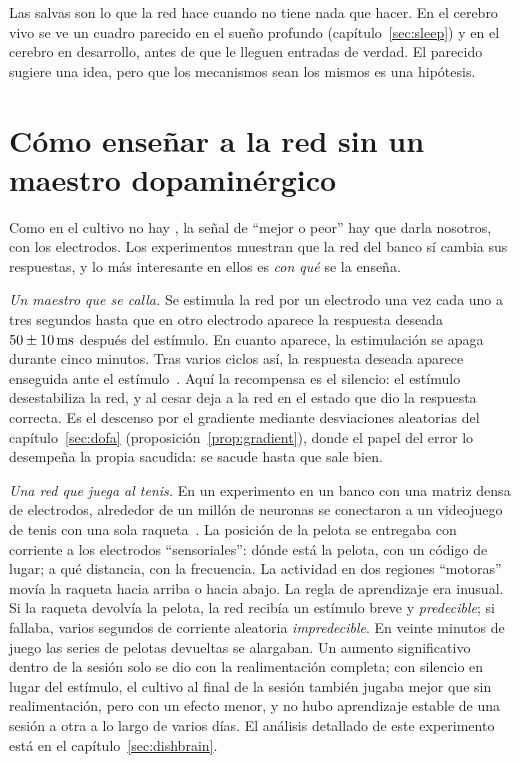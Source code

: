 Las salvas son lo que la red hace cuando no tiene nada que hacer. En el cerebro vivo se ve un cuadro parecido en el sueño profundo (capítulo~\ref{sec:sleep}) y en el cerebro en desarrollo, antes de que le lleguen entradas de verdad. El parecido sugiere una idea, pero que los mecanismos sean los mismos es una hipótesis.

\section{Cómo enseñar a la red sin un maestro dopaminérgico}

Como en el cultivo no hay , la señal de “mejor o peor” hay que darla nosotros, con los electrodos. Los experimentos muestran que la red del banco sí cambia sus respuestas, y lo más interesante en ellos es \emph{con qué} se la enseña.

\emph{Un maestro que se calla.} Se estimula la red por un electrodo una vez cada uno a tres segundos hasta que en otro electrodo aparece la respuesta deseada $50\pm10\,\text{ms}$ después del estímulo. En cuanto aparece, la estimulación se apaga durante cinco minutos. Tras varios ciclos así, la respuesta deseada aparece enseguida ante el estímulo~\cite{Shahaf2001}. Aquí la recompensa es el silencio: el estímulo desestabiliza la red, y al cesar deja a la red en el estado que dio la respuesta correcta. Es el descenso por el gradiente mediante desviaciones aleatorias del capítulo~\ref{sec:dofa} (proposición~\ref{prop:gradient}), donde el papel del error lo desempeña la propia sacudida: se sacude hasta que sale bien.

\emph{Una red que juega al tenis.} En un experimento en un banco con una matriz densa de electrodos, alrededor de un millón de neuronas se conectaron a un videojuego de tenis con una sola raqueta~\cite{Kagan2022}. La posición de la pelota se entregaba con corriente a los electrodos “sensoriales”: dónde está la pelota, con un código de lugar; a qué distancia, con la frecuencia. La actividad en dos regiones “motoras” movía la raqueta hacia arriba o hacia abajo. La regla de aprendizaje era inusual. Si la raqueta devolvía la pelota, la red recibía un estímulo breve y \emph{predecible}; si fallaba, varios segundos de corriente aleatoria \emph{impredecible}. En veinte minutos de juego las series de pelotas devueltas se alargaban. Un aumento significativo dentro de la sesión solo se dio con la realimentación completa; con silencio en lugar del estímulo, el cultivo al final de la sesión también jugaba mejor que sin realimentación, pero con un efecto menor, y no hubo aprendizaje estable de una sesión a otra a lo largo de varios días. El análisis detallado de este experimento está en el capítulo~\ref{sec:dishbrain}.

